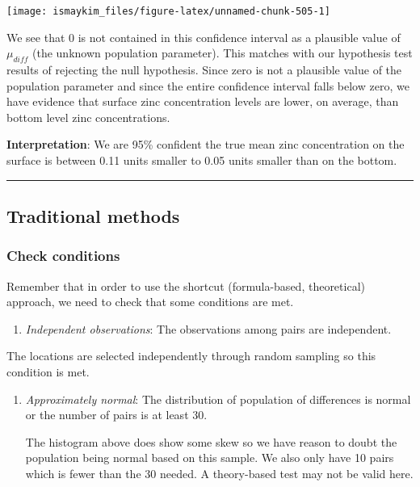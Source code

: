 \documentclass[12pt,]{krantz}
\providecommand{\tightlist}{%
  \setlength{\itemsep}{0pt}\setlength{\parskip}{0pt}}
\theoremstyle{definition}
\theoremstyle{definition}
\theoremstyle{definition}
\theoremstyle{remark}
\begin{document}
\begin{center}\texttt{[image: ismaykim\_files/figure-latex/unnamed-chunk-505-1]} \end{center}

We see that 0 is not contained in this confidence interval as a
plausible value of \(\mu_{diff}\) (the unknown population parameter).
This matches with our hypothesis test results of rejecting the null
hypothesis. Since zero is not a plausible value of the population
parameter and since the entire confidence interval falls below zero, we
have evidence that surface zinc concentration levels are lower, on
average, than bottom level zinc concentrations.

\textbf{Interpretation}: We are 95\% confident the true mean zinc
concentration on the surface is between 0.11 units smaller to 0.05 units
smaller than on the bottom.

\begin{center}\rule{0.5\linewidth}{\linethickness}\end{center}

\subsection{Traditional methods}\label{traditional-methods-4}

\subsubsection*{Check conditions}\label{check-conditions-4}


Remember that in order to use the shortcut (formula-based, theoretical)
approach, we need to check that some conditions are met.

\begin{enumerate}
\def\labelenumi{\arabic{enumi}.}
\tightlist
\item
  \emph{Independent observations}: The observations among pairs are
  independent.
\end{enumerate}

The locations are selected independently through random sampling so this
condition is met.

\begin{enumerate}
\def\labelenumi{\arabic{enumi}.}
\setcounter{enumi}{1}
\item
  \emph{Approximately normal}: The distribution of population of
  differences is normal or the number of pairs is at least 30.

  The histogram above does show some skew so we have reason to doubt the
  population being normal based on this sample. We also only have 10
  pairs which is fewer than the 30 needed. A theory-based test may not
  be valid here.
\end{enumerate}
\end{document}
